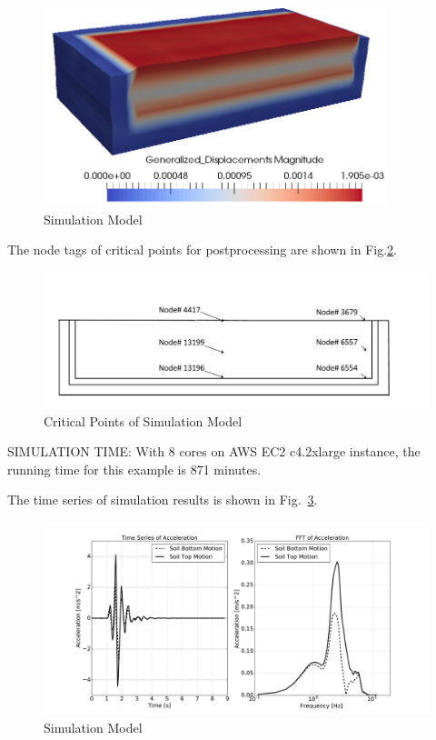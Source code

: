 \begin{figure}[H]
  \centering
  \includegraphics[width = 10cm]{./Figure-files/nonlinear_analysis_steps/free_field_3D/motion3D_DRM3D_free_field.png}
  \caption{Simulation Model}
  \label{fig_nonlinear_steps_D_motion_3D_model_results_free_field}
\end{figure}


The node tags of critical points for postprocessing are shown in Fig.\ref{fig_points_soil_foundation}.

\begin{figure}[H]
  \centering
  \includegraphics[width = 12cm]{./Figure-files/nonlinear_analysis_steps/free_field_3D/free_field_3D_node_location.pdf}
  \caption{Critical Points of Simulation Model}
  \label{fig_points_soil_foundation}
\end{figure}

SIMULATION TIME: With 8 cores on AWS EC2 c4.2xlarge instance, the running time for this example is 871 minutes.


The time series of simulation results is shown in Fig.~\ref{fig_decon_3D_motion_1D_model_results_top_bottom_time_series_fr3d}.
\begin{figure}[H]
  \centering
  \includegraphics[width = 15cm]{./Figure-files/nonlinear_analysis_steps/free_field_3D/DRM3D_motion_node_4454_x_acce_compare.pdf}
  \caption{Simulation Model}
  \label{fig_decon_3D_motion_1D_model_results_top_bottom_time_series_fr3d}
\end{figure}

